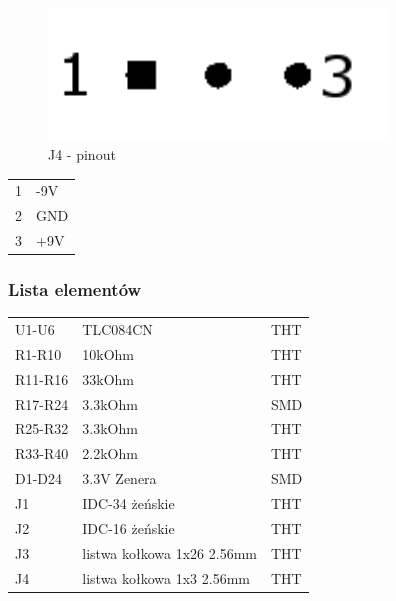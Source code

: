 \documentclass{article}
\begin{document}
\begin{figure}[H]
	\centering
	\includegraphics[width=9cm]{J4.png}
	\caption{J4 - pinout}
	\label{rys:J4 - pinout}
\end{figure}

\begin{table}[H]
	\centering
	\label{J4 - pinout}
	\begin{tabular}{ll}
	1 		&	-9V					\\
	2		&	GND					\\
	3		&	+9V					\\
\end{tabular}
\end{table}

\subsubsection{Lista elementów}
\begin{table}[H]
	\centering
	\label{Bill of materials}
\begin{tabular}{lll}
U1-U6		&	TLC084CN			&	THT	\\
R1-R10		&	10kOhm				&	THT	\\
R11-R16		&	33kOhm				&	THT	\\
R17-R24		&	3.3kOhm				&	SMD	\\
R25-R32		&	3.3kOhm				&	THT	\\
R33-R40		&	2.2kOhm				&	THT	\\
D1-D24		&	3.3V Zenera			&	SMD	\\
J1		&	IDC-34 żeńskie			&	THT	\\
J2		&	IDC-16 żeńskie			&	THT	\\
J3		&	listwa kołkowa 1x26 2.56mm	&	THT	\\
J4		&	listwa kołkowa 1x3 2.56mm	&	THT	\\
\end{tabular}
\end{table}
\end{document}
